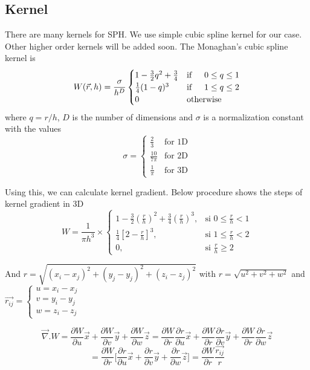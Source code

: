 \documentclass{article}
\begin{document}
\subsection{Kernel}
There are many kernels for SPH. We use simple cubic spline kernel for our case. Other higher order kernels will be added soon. The Monaghan's cubic spline kernel is
\begin{equation}
W(\vec{r},h) = \frac{\sigma}{h^D} \begin{cases}
1-\frac{3}{2} q^2 + \frac{3}{4} & \text{if} \indent 0 \leq q \leq 1 \\
\frac{1}{4} (1-q)^3  & \text{if} \indent 1 \leq q \leq 2 \\
0 & \text{otherwise}
\end{cases}
\end{equation}
where $q = r/h$, $D$ is the number of dimensions and $\sigma$ is a normalization constant with the values
\begin{equation}
\sigma =  \begin{cases}
\frac{2}{3} & \text{for 1D}  \\
\frac{10}{7 \pi} & \text{for 2D} \\
\frac{1}{\pi} & \text{for 3D}
\end{cases}
\end{equation}

Using this, we can calculate kernel gradient. Below procedure shows the steps of kernel gradient in 3D
$$W = \frac{1}{\pi h^3} \times \begin{cases} 1 - \frac{3}{2} (\frac{r}{h})^2 + \frac{3}{4} (\frac{r}{h})^3, & \mbox{si } 0 \leq \frac{r}{h} < 1 \\ \frac{1}{4} [2-\frac{r}{h}]^3, & \mbox{si } 1 \leq \frac{r}{h} < 2\\ 0, & \mbox{si } \frac{r}{h} \geq 2 \end{cases}$$

And $r=\sqrt{(x_i-x_j)^2 + (y_j-y_j)^2 + (z_i-z_j)^2}$
with $r = \sqrt{u^2+v^2+w^2}$ and
$ \vec{r_{ij}} = \begin{cases} u = x_i - x_j \\ v = y_i-y_j \\ w = z_i-z_j \end{cases} $

$$ \vec{\nabla} . W = \frac{\partial W}{\partial u} \vec{x} + \frac{\partial W}{\partial v} \vec{y} + \frac{\partial W}{\partial w} \vec{z}  =  \frac{\partial W}{\partial r} \frac{\partial r}{\partial u} \vec{x} + \frac{\partial W}{\partial r}  \frac{\partial r}{\partial v} \vec{y} + \frac{\partial W}{\partial r} \frac{\partial r}{\partial w} \vec{z} $$
$$ = \frac{\partial W}{\partial r} \Big[ \frac{\partial r}{\partial u}\vec{x} + \frac{\partial r}{\partial v} \vec{y} + \frac{\partial r}{\partial w} \vec{z}\Big] = \frac{\partial W}{\partial r} \frac{\vec{r_{ij}}}{r} $$
\end{document}
